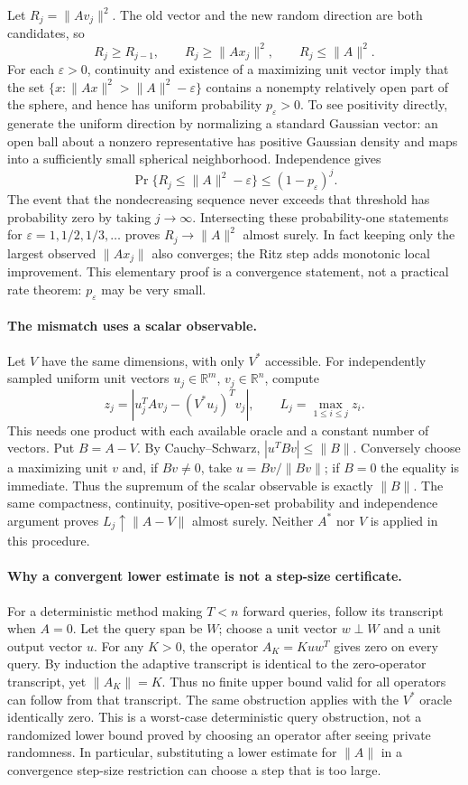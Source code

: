 \documentclass[11pt]{article}
\begin{document}
Let $R_j=\|Av_j\|^2$. The old vector and the new random direction are both
candidates, so
\[
 R_j\geq R_{j-1},\qquad R_j\geq\|Ax_j\|^2,\qquad R_j\leq\|A\|^2.
\]
For each $\varepsilon>0$, continuity and existence of a maximizing unit vector
imply that the set $\{x:\|Ax\|^2>\|A\|^2-\varepsilon\}$ contains a
nonempty relatively open part of the sphere, and hence has uniform probability
$p_\varepsilon>0$. To see positivity directly, generate the uniform direction
by normalizing a standard Gaussian vector: an open ball about a nonzero
representative has positive Gaussian density and maps into a sufficiently small
spherical neighborhood. Independence gives
\[
 \Pr\{R_j\leq\|A\|^2-\varepsilon\}\leq(1-p_\varepsilon)^j.
\]
The event that the nondecreasing sequence never exceeds that threshold has
probability zero by taking $j\to\infty$. Intersecting these probability-one
statements for $\varepsilon=1,1/2,1/3,\ldots$ proves
$R_j\to\|A\|^2$ almost surely. In fact keeping only the largest observed
$\|Ax_j\|$ also converges; the Ritz step adds monotonic local improvement.
This elementary proof is a convergence statement, not a practical rate theorem:
$p_\varepsilon$ may be very small.

\paragraph{The mismatch uses a scalar observable.}
Let $V$ have the same dimensions, with only $V^*$ accessible. For independently
sampled uniform unit vectors $u_j\in\mathbb R^m$, $v_j\in\mathbb R^n$,
compute
\[
 z_j=\left|u_j^TAv_j-(V^*u_j)^Tv_j\right|,
 \qquad L_j=\max_{1\leq i\leq j}z_i.
\]
This needs one product with each available oracle and a constant number of
vectors. Put $B=A-V$. By Cauchy--Schwarz, $|u^TBv|\leq\|B\|$.
Conversely choose a maximizing unit $v$ and, if $Bv\ne0$, take
$u=Bv/\|Bv\|$; if $B=0$ the equality is immediate.
Thus the supremum of the scalar observable is exactly $\|B\|$.
The same compactness, continuity, positive-open-set probability and independence
argument proves $L_j\uparrow\|A-V\|$ almost surely. Neither $A^*$ nor $V$
is applied in this procedure.

\paragraph{Why a convergent lower estimate is not a step-size certificate.}
For a deterministic method making $T<n$ forward queries, follow its transcript
when $A=0$. Let the query span be $W$; choose a unit vector $w\perp W$ and a
unit output vector $u$. For any $K>0$, the operator
$A_K=Kuw^T$ gives zero on every query. By induction the adaptive transcript is
identical to the zero-operator transcript, yet $\|A_K\|=K$.
Thus no finite upper bound valid for all operators can follow from that transcript.
The same obstruction applies with the $V^*$ oracle identically zero.
This is a worst-case deterministic query obstruction, not a randomized lower
bound proved by choosing an operator after seeing private randomness.
In particular, substituting a lower estimate for $\|A\|$ in a convergence
step-size restriction can choose a step that is too large.
\end{document}
